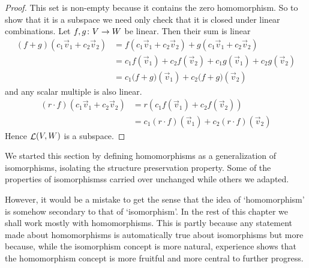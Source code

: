 \begin{proof}
This set is non-empty because it contains the zero homomorphism.
So to show that it is a subspace we need only check that it is 
closed under linear combinations.
Let \( \mbox{$f,g\colon V\to W$} \) be linear. 
Then their sum is linear
\begin{align*}
   (f+g)(c_1\vec{v}_1+c_2\vec{v}_2)
   &=f(c_1\vec{v}_1+c_2\vec{v}_2) + 
   g(c_1\vec{v}_1+c_2\vec{v}_2)       \\
   &=c_1f(\vec{v}_1)+c_2f(\vec{v}_2)
   +c_1g(\vec{v}_1)+c_2g(\vec{v}_2)   \\
   &=c_1\bigl(f+g\bigr)(\vec{v}_1)+c_2\bigl(f+g\bigr)(\vec{v}_2)
\end{align*}
and any scalar multiple is also linear.
\begin{align*}
   (r\cdot f)(c_1\vec{v}_1+c_2\vec{v}_2)
   &=r(c_1f(\vec{v}_1)+c_2f(\vec{v}_2))  \\
   &=c_1(r\cdot f)(\vec{v}_1)+c_2(r\cdot f)(\vec{v}_2)
\end{align*}
Hence \( \mathop{{\cal L}}(V,W) \) is a subspace.
\end{proof}

We started this section by 
defining homomorphisms as a generalization of isomorphisms,
isolating the structure preservation property.
Some of the properties of isomorphismss carried over unchanged
while others we adapted.

However, it would be a mistake to get the sense that 
the idea of 
`homomorphism' is somehow secondary to
that of `isomorphism'.
In the rest of this chapter we shall work mostly with homomorphisms.
This is
partly because any statement made about homomorphisms is automatically true 
about isomorphisms but more because, 
while the isomorphism concept is more natural, 
experience shows that the homomorphism concept 
is more fruitful and more central to further progress.

